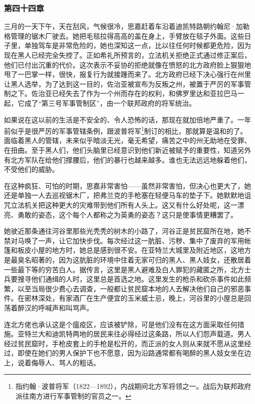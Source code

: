 \subsubsection{第四十四章}

\par 三月的一天下午，天在刮风，气候很冷，思嘉赶着车沿着迪凯特路朝约翰尼·加勒格管理的锯木厂驶去。她把毛毯拉得高高的盖在身上，手臂放在毯子外面。这些日子里，单独驾车是非常危险的，她也深知这一点，比以往任何时候都更危险，因为现在黑人已经完全失控了。正如希礼所预言的，立法机关拒绝正式通过修正案后，他们已付出沉重的代价。这次表示不妥协的拒绝就像在愤怒的北方政府脸上狠狠地甩了一巴掌一样，很快，报复行为就接踵而来了。北方政府已经下决心强行在州里让黑人选举，为了达到这一目的，佐治亚被宣布为反叛之州，被置于严厉的军事管制之下。佐治亚已经失去了作为一个州而存在的权利，和佛罗里达和亚拉巴马一起，它成了“第三号军事管制区”，由一个联邦政府的将军统治。
\par 如果说在这以前的生活是不安全的、令人恐怖的话，那现在就加倍地严重了。一年前似乎是很严厉的军事管辖条例，跟波普将军\footnote{指约翰·波普将军（1822—1892），内战期间北方军将领之一。战后为联邦政府派往南方进行军事管制的官员之一。}制订的相比，那就算是温和的了。面临着黑人的管辖，未来似乎暗淡无光，毫无希望，痛苦之中的州无助地在受罪、在扭曲。至于黑人们，他们头脑里已经意识到他们新近被赋予的重要性，知道另外有北方军队在给他们撑腰后，他们的暴行也越来越多。谁也无法远远地躲着他们，不受他们的威胁。
\par 在这种疯狂、可怕的时期，思嘉非常害怕——虽然非常害怕，但决心也更大了，她还是单独一人去巡视锯木厂，把弗兰克的手枪塞在轻便马车的垫子下。她默默地诅咒立法机关把这种更大的灾难带到他们所有人头上。这又有什么好处呢，这一漂亮、勇敢的姿态，这个每个人都称之为英勇的姿态？这只是使事情更糟罢了。
\par 她驶近那条通往河谷里那些光秃秃的树木的小路了，河谷正是贫民窟所在地，她不禁对马唤了一声，让它加快步伐。每次经过这一肮脏、污秽、集中了废弃的军用帐篷和板皮小屋的地方时，她总是感到很不安。在亚特兰大城里及附近地区，这地方是最臭名昭著的，因为这肮脏的环境中住着无家可归的黑人、黑人妓女，还散居着一些最下等的穷苦白人。据传言，这里是黑人避难及白人罪犯的藏匿之所，北方士兵要搜寻他们通缉的人时，这里总是首选之地。这里发生的枪杀和砍杀事件如此频繁，以至当局很少费心去调查，一般都让贫民窟本地的人去解决他们自己的邪恶事件。在密林深处，有家酒厂在生产便宜的玉米威士忌，晚上，河谷里的小屋总是回荡着醉汉的呼喊声和叫骂声。
\par 连北方佬也承认这是个瘟疫区，应该被铲除，可是他们没有在这方面采取任何措施。亚特兰大和迪凯特两地的居民来往必得经过这条路，所以人们怨声载道。男人经过贫民窟时，手枪皮套上的手枪是松开的，而正派的女人则从来就不愿从这里经过，即使在她们的男人保护下也不愿意，因为沿路通常都有喝醉的黑人妓女坐在边上，说着侮辱人、骂人的粗话。
